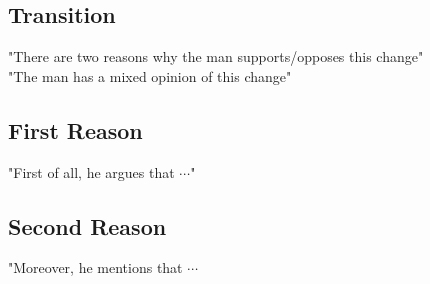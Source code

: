 \documentclass[11pt]{article}
\begin{document}
\subsection*{Transition}
"There are two reasons why the man supports/opposes this change"\\

"The man has a mixed opinion of this change"\\

\subsection*{First Reason}
"First of all, he argues that $\cdots$"\\

\subsection*{Second Reason}

"Moreover, he mentions that $\cdots$\\
\end{document}
